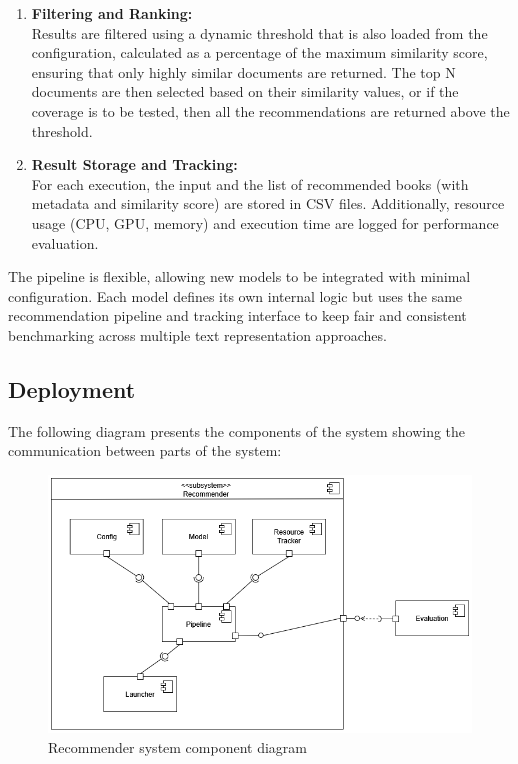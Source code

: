 \documentclass[\myFontSize,a4paper,oneside,hidelinks]{article}
\begin{document}
\begin{enumerate}
    \item \textbf{Filtering and Ranking:}\\
Results are filtered using a dynamic threshold that is also loaded from the configuration, calculated as a percentage of the maximum similarity score, ensuring that only highly similar documents are returned. The top N documents are then selected based on their similarity values, or if the coverage is to be tested, then all the recommendations are returned above the threshold.

    \item \textbf{Result Storage and Tracking:}\\
For each execution, the input and the list of recommended books (with metadata and similarity score) are stored in CSV files. Additionally, resource usage (CPU, GPU, memory) and execution time are logged for performance evaluation.
\end{enumerate}

The pipeline is flexible, allowing new models to be integrated with minimal configuration. Each model defines its own internal logic but uses the same recommendation pipeline and tracking interface to keep fair and consistent benchmarking across multiple text representation approaches.

%
%
%



\subsection{Deployment}
The following diagram presents the components of the system showing the communication between parts of the system:
\begin{figure}[H]
    \centering
    \includegraphics[width=1\textwidth]{img/component.png}
    \caption{Recommender system component diagram}
    \label{fig:component_diagram}
\end{figure}
\end{document}
